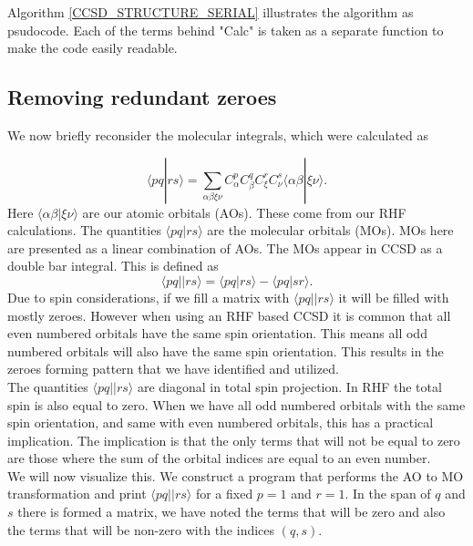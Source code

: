 \documentclass[a4paper,norsk,11pt,twoside]{report}
\begin{document}
Algorithm \ref{CCSD_STRUCTURE_SERIAL} illustrates the algorithm as psudocode. Each of the terms behind "Calc" is taken as a separate function to make the code easily readable. 

\subsection{Removing redundant zeroes \label{compact_storage}}
We now briefly reconsider the molecular integrals, which were calculated as

\begin{equation}
\langle pq|rs \rangle = \sum_{\alpha \beta \xi \nu} C_{\alpha}^p
C_{\beta}^q C_{\xi}^r C_{\nu}^s \langle \alpha \beta | \xi \nu \rangle
.
\end{equation}
Here $\langle \alpha \beta | \xi \nu \rangle$ are our atomic orbitals
(AOs). These come from our RHF calculations. The quantities $\langle pq|rs \rangle$
are the molecular orbitals (MOs). MOs here are presented as a linear
combination of AOs. The MOs appear in CCSD as a double bar
integral. This is defined as 
\begin{equation}
\langle pq||rs \rangle = \langle pq | rs \rangle
- \langle pq | sr \rangle  .
\end{equation}
Due to spin considerations, if we fill a matrix with $\langle pq||rs
\rangle$ it will be filled with mostly zeroes. However when using an
RHF based CCSD it is common that all even numbered orbitals have the
same spin orientation. This means all odd numbered orbitals will also
have the same spin orientation. This results in the zeroes forming
pattern that we have identified and utilized. \\

The quantities $\langle pq || rs \rangle$ are diagonal in total spin
projection. In RHF the total spin is also equal to zero. When we have
all odd numbered orbitals with the same spin orientation, and same
with even numbered orbitals, this has a practical implication. The
implication is that the only terms that will not be equal to zero are
those where the sum of the orbital indices are equal to an even
number. \\

We will now visualize this. We construct a program that performs the
AO to MO transformation and print $\langle pq||rs \rangle$ for a fixed
$p=1$ and $r=1$. In the span of $q$ and $s$ there is formed a matrix,
we have noted the terms that will be zero and also the terms that will
be non-zero with the indices $(q, s)$.
\end{document}
